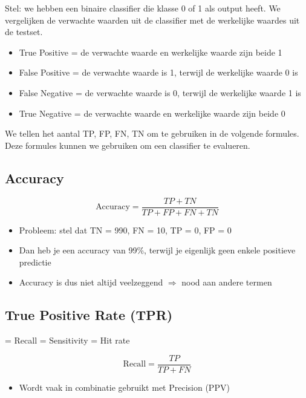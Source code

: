 \documentclass{article}
\begin{document}
Stel: we hebben een binaire classifier die klasse 0 of 1 als output heeft.
We vergelijken de verwachte waarden uit de classifier met de werkelijke waardes uit de testset.

\begin{itemize}
    \item True Positive = de verwachte waarde en werkelijke waarde zijn beide 1
    \item False Positive = de verwachte waarde is 1, terwijl de werkelijke waarde 0 is
    \item False Negative = de verwachte waarde is 0, terwijl de werkelijke waarde 1 is
    \item True Negative = de verwachte waarde en werkelijke waarde zijn beide 0
\end{itemize}

We tellen het aantal TP, FP, FN, TN om te gebruiken in de volgende formules. 
Deze formules kunnen we gebruiken om een classifier te evalueren.

\subsection{Accuracy}

\begin{equation}
    \text{Accuracy} = \frac{TP + TN}{TP + FP + FN + TN}
\end{equation}

\begin{itemize}
    \item Probleem: stel dat TN = 990, FN = 10, TP = 0, FP = 0
    \item Dan heb je een accuracy van 99\%, terwijl je eigenlijk geen enkele positieve predictie
    \item Accuracy is dus niet altijd veelzeggend $\Rightarrow$ nood aan andere termen
\end{itemize}

\subsection{True Positive Rate (TPR)}

= Recall = Sensitivity = Hit rate

\begin{equation}
    \text{Recall} = \frac{TP}{TP + FN}
\end{equation}

\begin{itemize}
    \item Wordt vaak in combinatie gebruikt met Precision (PPV)
\end{itemize}
\end{document}

